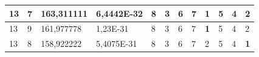 \documentclass[conference]{IEEEtran}
\begin{document}
\begin{table}[]
\begin{tabular}{|llll|llllllll|}
\multicolumn{1}{|l|}{13}                                                    & \multicolumn{1}{l|}{7}                                                        & \multicolumn{1}{l|}{163,311111}                                                   & 6,4442E-32                     & \multicolumn{1}{l|}{8}                                                  & \multicolumn{1}{l|}{3}                                                  & \multicolumn{1}{l|}{6}                                                  & \multicolumn{1}{l|}{7}                                                  & \multicolumn{1}{l|}{\textbf{1}}                                         & \multicolumn{1}{l|}{5}                                                  & \multicolumn{1}{l|}{4}                                                  & 2                          \\ \hline
\multicolumn{1}{|l|}{13}                                                    & \multicolumn{1}{l|}{9}                                                        & \multicolumn{1}{l|}{161,977778}                                                   & 1,23E-31                       & \multicolumn{1}{l|}{8}                                                  & \multicolumn{1}{l|}{3}                                                  & \multicolumn{1}{l|}{6}                                                  & \multicolumn{1}{l|}{7}                                                  & \multicolumn{1}{l|}{\textbf{1}}                                         & \multicolumn{1}{l|}{5}                                                  & \multicolumn{1}{l|}{4}                                                  & 2                          \\ \hline
\multicolumn{1}{|l|}{13}                                                    & \multicolumn{1}{l|}{8}                                                        & \multicolumn{1}{l|}{158,922222}                                                   & 5,4075E-31                     & \multicolumn{1}{l|}{8}                                                  & \multicolumn{1}{l|}{3}                                                  & \multicolumn{1}{l|}{6}                                                  & \multicolumn{1}{l|}{7}                                                  & \multicolumn{1}{l|}{2}                                                  & \multicolumn{1}{l|}{5}                                                  & \multicolumn{1}{l|}{4}                                                  & \textbf{1}                 \\ \hline

\end{tabular}
\end{table}
\end{document}
